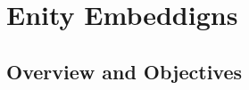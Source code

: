 
\chapter{Enity Embeddigns}\label{chap:entity}


\section{Overview and Objectives}\label{sec:entity_overview}
